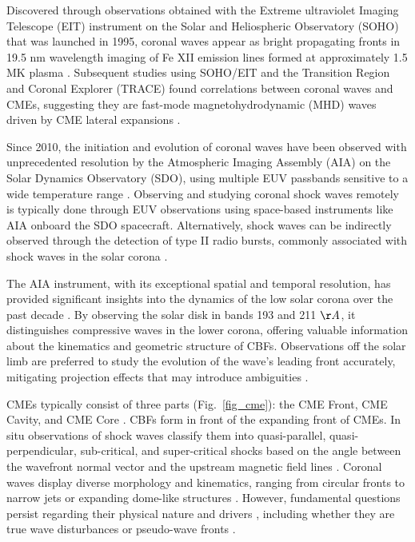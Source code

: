 Discovered through observations obtained with the Extreme ultraviolet Imaging Telescope (EIT) instrument on the Solar and Heliospheric Observatory (SOHO) that was launched in 1995, coronal waves appear as bright propagating fronts in 19.5 nm wavelength imaging of Fe XII emission lines formed at approximately 1.5 MK plasma \citep{thompson_1998}. Subsequent studies using SOHO/EIT and the Transition Region and Coronal Explorer (TRACE) found correlations between coronal waves and CMEs, suggesting they are fast-mode magnetohydrodynamic (MHD) waves driven by CME lateral expansions \citep{biesecker_2002}.

Since 2010, the initiation and evolution of coronal waves have been observed with unprecedented resolution by the Atmospheric Imaging Assembly (AIA) on the Solar Dynamics Observatory (SDO), using multiple EUV passbands sensitive to a wide temperature range \citep{lemen_2012, nitta_2013}. Observing and studying coronal shock waves remotely is typically done through EUV observations using space-based instruments like AIA onboard the SDO spacecraft. Alternatively, shock waves can be indirectly observed through the detection of type II radio bursts, commonly associated with shock waves in the solar corona \citep{vrsnak_2008}.

The AIA instrument, with its exceptional spatial and temporal resolution, has provided significant insights into the dynamics of the low solar corona over the past decade \citep{patsourakos_2010, ma_2011, kozarev_2011}. By observing the solar disk in bands 193 and 211 $\AA$, it distinguishes compressive waves in the lower corona, offering valuable information about the kinematics and geometric structure of CBFs. Observations off the solar limb are preferred to study the evolution of the wave's leading front accurately, mitigating projection effects that may introduce ambiguities \citep{kozarev_2015}.

CMEs typically consist of three parts (Fig.~\ref{fig_cme}): the CME Front, CME Cavity, and CME Core \citep{vourlidas_2013}. CBFs form in front of the expanding front of CMEs. In situ observations of shock waves classify them into quasi-parallel, quasi-perpendicular, sub-critical, and super-critical shocks based on the angle between the wavefront normal vector and the upstream magnetic field lines \citep{tsurutani_1985}. Coronal waves display diverse morphology and kinematics, ranging from circular fronts to narrow jets or expanding dome-like structures \citep{veronig_2010}. However, fundamental questions persist regarding their physical nature and drivers \citep{chen_2016, vrsnak_2008, warmuth_2015}, including whether they are true wave disturbances or pseudo-wave fronts \citep{wills_2007, vrsnak_2008, delannee_1999, chen_2002}.

